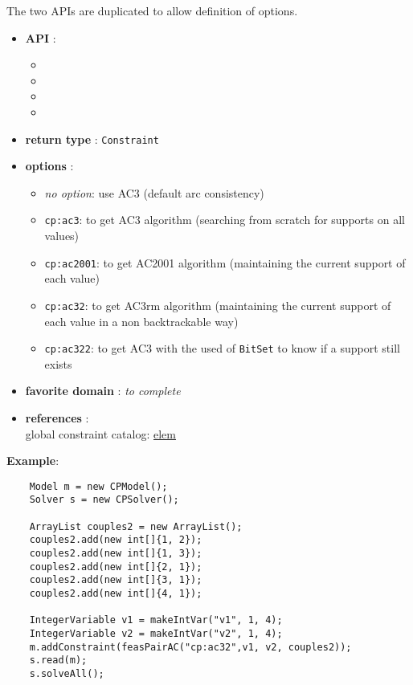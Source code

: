 The two APIs are duplicated to allow definition of options. 
\begin{itemize}
	\item \textbf{API} :
	\begin{itemize}
		\item {}
		\item {}
		\item {}
		\item {}
	\end{itemize}
	\item \textbf{return type} : \texttt{Constraint}
	\item \textbf{options} :
	\begin{itemize}
		\item \emph{no option}: use AC3 (default arc consistency)
		\item \texttt{cp:ac3}: to get AC3 algorithm (searching from scratch for supports on all values)
		\item \texttt{cp:ac2001}: to get AC2001 algorithm (maintaining the current support of each value)
		\item \texttt{cp:ac32}: to get AC3rm algorithm (maintaining the current support of each value in a non backtrackable way)
		\item \texttt{cp:ac322}: to get AC3 with the used of \texttt{BitSet} to know if a support still exists
	\end{itemize}
	\item \textbf{favorite domain} : \emph{to complete}
	\item \textbf{references} :\\
      global constraint catalog: \href{http://www.emn.fr/x-info/sdemasse/gccat/Celem.html}{elem}
\end{itemize}



\textbf{Example}:
\begin{lstlisting}
	Model m = new CPModel();
	Solver s = new CPSolver();
	
	ArrayList couples2 = new ArrayList();
	couples2.add(new int[]{1, 2});
	couples2.add(new int[]{1, 3});
	couples2.add(new int[]{2, 1});
	couples2.add(new int[]{3, 1});
	couples2.add(new int[]{4, 1});
	
	IntegerVariable v1 = makeIntVar("v1", 1, 4);
	IntegerVariable v2 = makeIntVar("v2", 1, 4);
	m.addConstraint(feasPairAC("cp:ac32",v1, v2, couples2));
	s.read(m);
	s.solveAll();
\end{lstlisting} 

